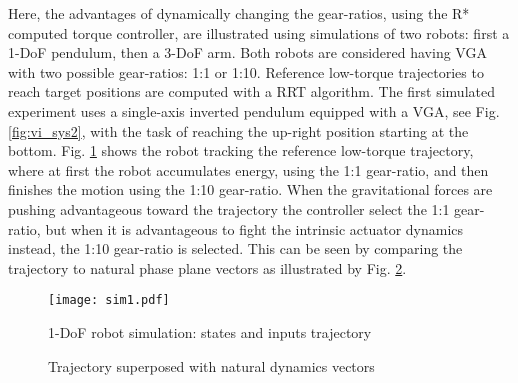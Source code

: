 Here, the advantages of dynamically changing the gear-ratios, using the R* computed torque controller, are illustrated using simulations of two robots: first a 1-DoF pendulum, then a 3-DoF arm. Both robots are considered having VGA with two possible gear-ratios: 1:1 or 1:10. Reference low-torque trajectories to reach target positions are computed with a RRT algorithm. 
%
The first simulated experiment uses a single-axis inverted pendulum equipped with a VGA, see Fig. \ref{fig:vi_sys2}, with the task of reaching the up-right position starting at the bottom. Fig. \ref{fig:sim1} shows the robot tracking the reference low-torque trajectory, where at first the robot accumulates energy, using the 1:1 gear-ratio, and then finishes the motion using the 1:10 gear-ratio. When the gravitational forces are pushing advantageous toward the trajectory the controller select the 1:1 gear-ratio, but when it is advantageous to fight the intrinsic actuator dynamics instead, the 1:10 gear-ratio is selected. This can be seen by comparing the trajectory to natural phase plane vectors as illustrated by Fig. \ref{fig:pps}.
%
\begin{figure}[htp]
	\centering
		\texttt{[image: sim1.pdf]}
	\caption{1-DoF robot simulation: states and inputs trajectory}
	\label{fig:sim1}
\end{figure}
%
%
\begin{figure}[htp]
				\vspace{-10pt}
        \centering
        \caption{Trajectory superposed with natural dynamics vectors}
				\label{fig:pps}
\end{figure}

%

